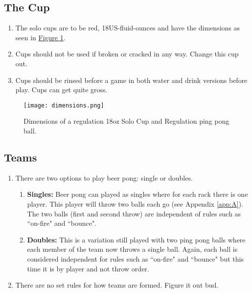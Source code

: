 	\subsection{The Cup}\label{ssec:Cup}
        \begin{enumerate}[label=(\roman*)]
            \item \label{sssec:Cup,dim} The solo cups are to be red, 18US-fluid-ounces and have the dimensions as seen in \hyperref[fig:solocup]{Figure \ref{fig:solocup}}. 
            \item \label{sssec:Cup,broken} Cups should not be used if broken or cracked in any way. Change this cup out. 
            \item \label{ssec:Cup,rinsing} Cups should be rinsed before a game in both water and drink versions before play. Cups can get quite gross. 
        \end{enumerate}
        \begin{figure}[H]
            \centering
            \texttt{[image: dimensions.png]}
            \caption{Dimensions of a regulation 18oz Solo Cup and Regulation ping pong ball.}
            \label{fig:solocup}
        \end{figure}
	\subsection{Teams}\label{ssec:Teams}
		\begin{enumerate}[label=(\roman*)]
            \item \label{sssec:teams,options} There are two options to play beer pong: single or doubles. 
                \begin{enumerate}[label=(\alph*), leftmargin=2cm]%
                    \item \textbf{Singles:} Beer pong can played as singles where for each rack there is one player.
                        This player will throw two balls each go (see Appendix \ref{app:A}).
                        The two balls (first and second throw) are independent of rules such as ``on-fire" and ``bounce".
                    \item \textbf{Doubles:}	This is a variation still played with two ping pong balls where each member of the team now throws a single ball.
                        Again, each ball is considered independent for rules such as ``on-fire" and ``bounce" but this time it is by player and not throw order.
                \end{enumerate} 
            \item \label{sssec:teams,choosing} There are no set rules for how teams are formed. Figure it out bud. 
        \end{enumerate}
